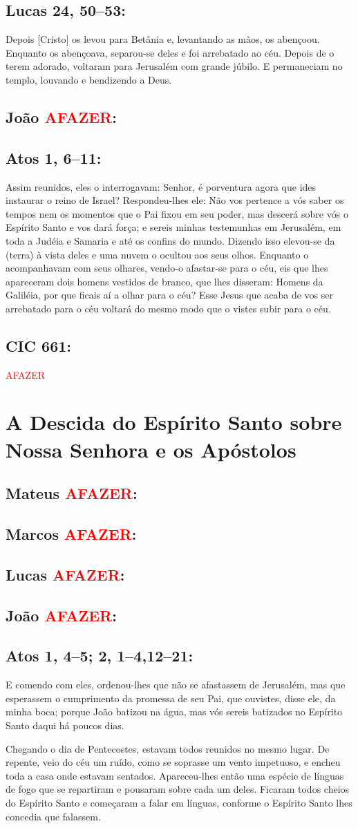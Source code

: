 \documentclass[10pt,a5paper]{book}
\newcommand{\from}[1]{\subsection*{#1}}
\newcommand{\TODO}{\textcolor{red}{\ttfamily AFAZER}}
\begin{document}
\from{Lucas 24, 50--53:}

Depois [Cristo] os levou para Betânia e, levantando as mãos, os abençoou.
Enquanto os abençoava, separou-se deles e foi arrebatado ao céu.
Depois de o terem adorado, voltaram para Jerusalém com grande júbilo.
E permaneciam no templo, louvando e bendizendo a Deus.

\from{João \TODO:}

\from{Atos 1, 6--11:}

Assim reunidos, eles o interrogavam:
Senhor, é porventura agora que ides instaurar o reino de Israel?
Respondeu-lhes ele:
Não vos pertence a vós saber os tempos nem os momentos que o Pai fixou em seu poder,
mas descerá sobre vós o Espírito Santo e vos dará força;
e sereis minhas testemunhas em Jerusalém, em toda a Judéia e Samaria e até os confins do mundo.
Dizendo isso elevou-se da (terra) à vista deles e uma nuvem o ocultou aos seus olhos.
Enquanto o acompanhavam com seus olhares, vendo-o afastar-se para o céu, eis que lhes apareceram dois homens vestidos de branco, que lhes disseram:
Homens da Galiléia, por que ficais aí a olhar para o céu? Esse Jesus que acaba de vos ser arrebatado para o céu voltará do mesmo modo que o vistes subir para o céu.

\from{CIC 661:}

\TODO


\section{A Descida do Espírito Santo sobre Nossa Senhora e os Apóstolos}

\from{Mateus \TODO:}

\from{Marcos \TODO:}

\from{Lucas \TODO:}

\from{João \TODO:}

\from{Atos 1, 4--5; 2, 1--4,12--21:}

E comendo com eles, ordenou-lhes que não se afastassem de Jerusalém, mas que esperassem o cumprimento da promessa de seu Pai, que ouvistes, disse ele, da minha boca;
porque João batizou na água, mas vós sereis batizados no Espírito Santo daqui há poucos dias.

Chegando o dia de Pentecostes, estavam todos reunidos no mesmo lugar.
De repente, veio do céu um ruído, como se soprasse um vento impetuoso, e encheu toda a casa onde estavam sentados.
Apareceu-lhes então uma espécie de línguas de fogo que se repartiram e pousaram sobre cada um deles.
Ficaram todos cheios do Espírito Santo e começaram a falar em línguas, conforme o Espírito Santo lhes concedia que falassem.
\end{document}
